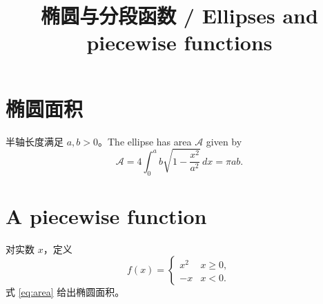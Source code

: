 \documentclass{ctexart}
\title{椭圆与分段函数 / Ellipses and piecewise functions}
\date{}
\newcommand{\area}{\mathcal{A}}
\begin{document}
\maketitle
\section{椭圆面积}
半轴长度满足 $a,b>0$。The ellipse has area $\area$ given by
\begin{equation}\label{eq:area}
  \area=4\int_0^a b\sqrt{1-\frac{x^2}{a^2}}\,dx=\pi ab .
\end{equation}
\section{A piecewise function}
对实数 $x$，定义
\begin{equation}
  f(x)=\begin{cases}
    x^2 & x\ge 0,\\
    -x & x<0 .
  \end{cases}
\end{equation}
式 \eqref{eq:area} 给出椭圆面积。
\end{document}
